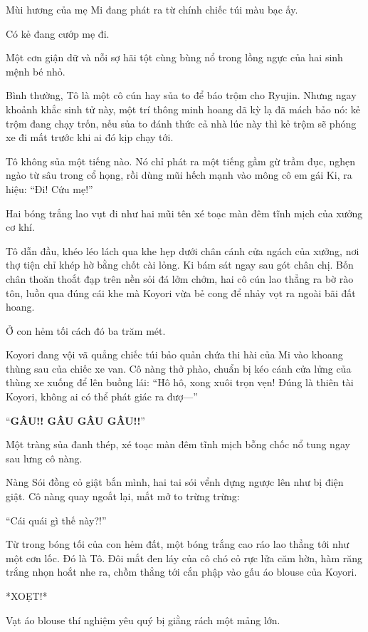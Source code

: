 \documentclass[../main.tex]{subfiles}
\begin{document}
Mùi hương của mẹ Mi đang phát ra từ chính chiếc túi màu bạc ấy.

Có kẻ đang cướp mẹ đi.

Một cơn giận dữ và nỗi sợ hãi tột cùng bùng nổ trong lồng ngực của hai sinh mệnh bé nhỏ.

Bình thường, Tô là một cô cún hay sủa to để báo trộm cho Ryujin. Nhưng ngay khoảnh khắc sinh tử này, một trí thông minh hoang dã kỳ lạ đã mách bảo nó: kẻ trộm đang chạy trốn, nếu sủa to đánh thức cả nhà lúc này thì kẻ trộm sẽ phóng xe đi mất trước khi ai đó kịp chạy tới.

Tô không sủa một tiếng nào. Nó chỉ phát ra một tiếng gầm gừ trầm đục, nghẹn ngào từ sâu trong cổ họng, rồi dùng mũi hếch mạnh vào mông cô em gái Ki, ra hiệu: ``Đi! Cứu mẹ!''

Hai bóng trắng lao vụt đi như hai mũi tên xé toạc màn đêm tĩnh mịch của xưởng cơ khí.

Tô dẫn đầu, khéo léo lách qua khe hẹp dưới chân cánh cửa ngách của xưởng, nơi thợ tiện chỉ khép hờ bằng chốt cài lỏng. Ki bám sát ngay sau gót chân chị. Bốn chân thoăn thoắt đạp trên nền sỏi đá lởm chởm, hai cô cún lao thẳng ra bờ rào tôn, luồn qua đúng cái khe mà Koyori vừa bẻ cong để nhảy vọt ra ngoài bãi đất hoang.

\ct

Ở con hẻm tối cách đó ba trăm mét.

Koyori đang vội vã quẳng chiếc túi bảo quản chứa thi hài của Mi vào khoang thùng sau của chiếc xe van. Cô nàng thở phào, chuẩn bị kéo cánh cửa lửng của thùng xe xuống để lên buồng lái: ``Hô hô, xong xuôi trọn vẹn! Đúng là thiên tài Koyori, không ai có thể phát giác ra đượ---''

``\textbf{GÂU!! GÂU GÂU GÂU!!}''

Một tràng sủa đanh thép, xé toạc màn đêm tĩnh mịch bỗng chốc nổ tung ngay sau lưng cô nàng.

Nàng Sói đồng cỏ giật bắn mình, hai tai sói vểnh dựng ngược lên như bị điện giật. Cô nàng quay ngoắt lại, mắt mở to trừng trừng:

``Cái quái gì thế này?!''

Từ trong bóng tối của con hẻm đất, một bóng trắng cao ráo lao thẳng tới như một cơn lốc. Đó là Tô. Đôi mắt đen láy của cô chó cỏ rực lửa căm hờn, hàm răng trắng nhọn hoắt nhe ra, chồm thẳng tới cắn phập vào gấu áo blouse của Koyori.

*XOẸT!*

Vạt áo blouse thí nghiệm yêu quý bị giằng rách một mảng lớn.
\end{document}
